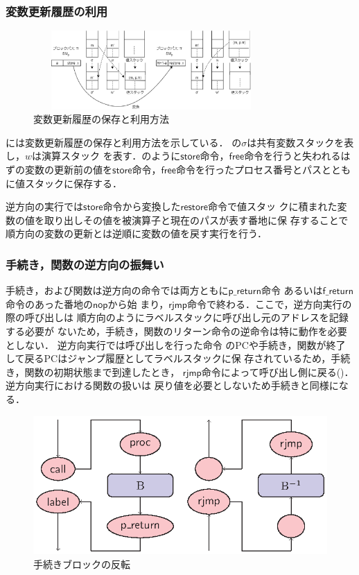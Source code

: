 \documentclass[submit,PRO]{ipsj}
\newcommand{\bcode}[1]{$\mathsf{#1}$}
\begin{document}
\subsubsection{変数更新履歴の利用}

\begin{figure}[tb]
\includegraphics[height=3.0cm,width=9.0cm]{./store.eps}
\caption{変数更新履歴の保存と利用方法}
\label{fig:store}
\end{figure}

には変数更新履歴の保存と利用方法を示している．
の$\sigma$は共有変数スタックを表し，$w$は演算スタック
を表す．のように\bcode{store}命令，\bcode{free}命令を行うと失われるはずの変数の更新前の値を\bcode{store}命令，\bcode{free}命令を行ったプロセス番号とパスとともに値スタックに保存する．

逆方向の実行では\bcode{store}命令から変換した\bcode{restore}命令で値スタッ
クに積まれた変数の値を取り出しその値を被演算子と現在のパスが表す番地に保
存することで順方向の変数の更新とは逆順に変数の値を戻す実行を行う．

\subsubsection{手続き，関数の逆方向の振舞い}

手続き，および関数は逆方向の命令では両方ともに\bcode{p\_return}命令
あるいは\bcode{f\_return}命令のあった番地の\bcode{nop}から始
まり，\bcode{rjmp}命令で終わる．ここで，逆方向実行の際の呼び出しは
順方向のようにラベルスタックに呼び出し元のアドレスを記録する必要が
ないため，手続き，関数のリターン命令の逆命令は特に動作を必要としない．
逆方向実行では呼び出しを行った命令
のPCや手続き，関数が終了して戻るPCはジャンプ履歴としてラベルスタックに保
存されているため，手続き，関数の初期状態まで到達したとき，
\bcode{rjmp}命令によって呼び出し側に戻る()．逆方向実行における関数の扱いは
戻り値を必要としないため手続きと同様になる．

\begin{figure}[tb]
\includegraphics[width=.75\linewidth]{./proc-flow.eps}
\caption{手続きブロックの反転}
\label{fig:procFlow}
\end{figure}
\end{document}
